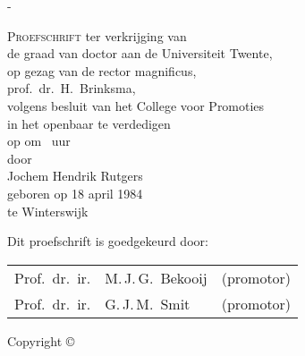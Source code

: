\thispagestyle{empty}

\calccentering{\unitlength}
\begin{adjustwidth*}{\unitlength}{-\unitlength}
	\begin{center}
		\null\vfill
		{\begin{Spacing}{1.2}\LARGE\scshape\thetitle\end{Spacing}}
		{\ifthenelse{\equal{\thesubtitle}{}}{}{\mbox{} \\[1.5ex]\Large\scshape\thesubtitle}}
		\vfill
		\vfill
		{\scshape Proefschrift}
		\vfill
		ter verkrijging van\\
		de graad van doctor aan de Universiteit Twente,\\
		op gezag van de rector magnificus,\\
		prof.\ dr.\ H.\ Brinksma,\\
		volgens besluit van het College voor Promoties\\
		in het openbaar te verdedigen\\
		op  om \thesistimedutch\ uur\\[3\onelineskip]

		door\\[\onelineskip]
		Jochem Hendrik Rutgers\\[2\onelineskip]
		geboren op 18 april 1984\\
		te Winterswijk
		\vfill
	\end{center}
\end{adjustwidth*}

\clearpage

\thispagestyle{empty}

\begin{flushleft}
Dit proefschrift is goedgekeurd door:\\
\bigskip
\def\small{\normalsize}%
\begin{tabular}{@{}r@{~~}ll}
Prof.~dr.~ir.\@		& M.\,J.\,G.~Bekooij	& (promotor) \\
Prof.~dr.~ir.\@		& G.\,J.\,M.~Smit		& (promotor) \\
\end{tabular}
\end{flushleft}

\vfill
{
Copyright \copyright\ \thesisyear\ \theauthor \\
 \thesisISBN
}

\cleardoublepage
